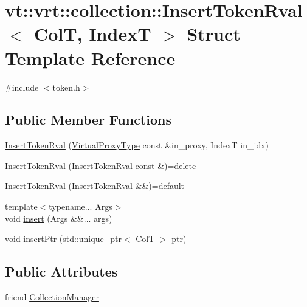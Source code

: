 \hypertarget{structvt_1_1vrt_1_1collection_1_1_insert_token_rval}{}\section{vt\+:\+:vrt\+:\+:collection\+:\+:Insert\+Token\+Rval$<$ ColT, IndexT $>$ Struct Template Reference}
\label{structvt_1_1vrt_1_1collection_1_1_insert_token_rval}


{\ttfamily \#include $<$token.\+h$>$}

\subsection*{Public Member Functions}
\begin{DoxyCompactItemize}
\item 
\hyperlink{structvt_1_1vrt_1_1collection_1_1_insert_token_rval_a346da7d8d739227c8918399c43095e16}{Insert\+Token\+Rval} (\hyperlink{namespacevt_a1b417dd5d684f045bb58a0ede70045ac}{Virtual\+Proxy\+Type} const \&in\+\_\+proxy, IndexT in\+\_\+idx)
\item 
\hyperlink{structvt_1_1vrt_1_1collection_1_1_insert_token_rval_aea48b21e03ac5cab59b9e470af56f8c6}{Insert\+Token\+Rval} (\hyperlink{structvt_1_1vrt_1_1collection_1_1_insert_token_rval}{Insert\+Token\+Rval} const \&)=delete
\item 
\hyperlink{structvt_1_1vrt_1_1collection_1_1_insert_token_rval_ad7bd979f47256df2d3357e2232ca23c2}{Insert\+Token\+Rval} (\hyperlink{structvt_1_1vrt_1_1collection_1_1_insert_token_rval}{Insert\+Token\+Rval} \&\&)=default
\item 
{\footnotesize template$<$typename... Args$>$ }\\void \hyperlink{structvt_1_1vrt_1_1collection_1_1_insert_token_rval_a24233cafaa4d9a311c757573e3a61352}{insert} (Args \&\&... args)
\item 
void \hyperlink{structvt_1_1vrt_1_1collection_1_1_insert_token_rval_ad6201b0fcbd9b6647fb28c683f10571e}{insert\+Ptr} (std\+::unique\+\_\+ptr$<$ ColT $>$ ptr)
\end{DoxyCompactItemize}
\subsection*{Public Attributes}
\begin{DoxyCompactItemize}
\item 
friend \hyperlink{structvt_1_1vrt_1_1collection_1_1_insert_token_rval_a10b822803e1ad9860efabbb9d979c842}{Collection\+Manager}
\end{DoxyCompactItemize}
